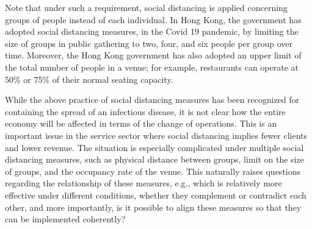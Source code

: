 Note that under such a requirement, social distancing is applied concerning groups of people instead of each individual. In Hong Kong, the government has adopted social distancing measures, in the Covid 19 pandemic, by limiting the size of groups in public gathering to two, four, and six people per group over time. Moreover, the Hong Kong government has also adopted an upper limit of the total number of people in a venue; for example, restaurants can operate at 50\% or 75\% of their normal seating capacity.


While the above practice of social distancing measures has been recognized for containing the spread of an infectious disease,  it is not clear how the entire economy will be affected in terms of the change of operations. This is an important issue in the service sector where social distancing implies fewer clients and lower revenue. The situation is especially complicated under multiple social distancing measures, such as physical distance between groups, limit on the size of groups, and the occupancy rate of the venue. This naturally raises questions regarding the relationship of these measures, e.g., which is relatively more effective under different conditions, whether they complement or contradict each other, and more importantly, is it possible to align these measures so that they can be implemented coherently? 



